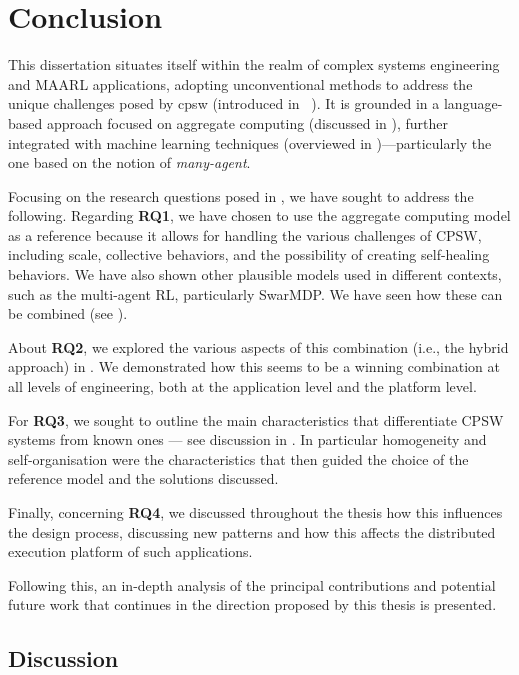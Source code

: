 \chapter{Conclusion}\label{chap:wrap-up}%
This dissertation situates itself within the realm of complex systems engineering and \acf{MAARL} applications, 
 adopting unconventional methods to address the unique challenges posed by \acf{cpsw} (introduced in ~). 
 It is grounded in a language-based approach focused on aggregate computing (discussed in ), 
 further integrated with machine learning techniques (overviewed in )---particularly the one based on the notion of \emph{many-agent}. 

Focusing on the research questions posed in , 
 we have sought to address the following.
Regarding \textbf{RQ1}, 
   we have chosen to use the aggregate computing model 
   as a reference because it allows for
   handling the various challenges of CPSW, 
   including scale, collective behaviors, and the possibility of creating self-healing behaviors. 
   We have also shown other plausible models used in different contexts, such as the multi-agent RL, particularly SwarMDP. 
   We have seen how these can be combined (see ).
 
About \textbf{RQ2}, 
  we explored the various aspects of this combination (i.e., the hybrid approach) in . 
  We demonstrated how this seems to be a winning combination at all
  levels of engineering, 
  both at the application level and the platform level.
 
 For \textbf{RQ3}, 
  we sought to outline the main characteristics that differentiate CPSW
  systems from known ones --- see discussion in . 
  In particular homogeneity and self-organisation were the characteristics that then
  guided the choice of the reference model and the solutions discussed.
 
Finally, concerning \textbf{RQ4}, 
 we discussed throughout the thesis how this
 influences the design process, 
 discussing new patterns and how this affects the
 distributed execution platform of such applications. 
 
Following this, 
 an in-depth analysis of the principal contributions 
 and potential future work that continues in the direction proposed by this thesis is presented.
\section{Discussion}

